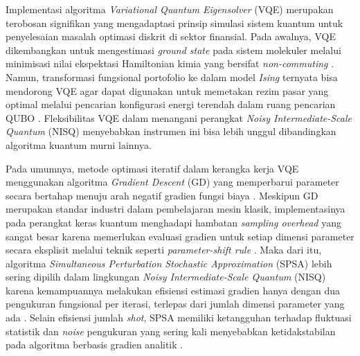 Implementasi algoritma \textit{Variational Quantum Eigensolver} (VQE) merupakan terobosan signifikan yang mengadaptasi prinsip simulasi sistem kuantum untuk penyelesaian masalah optimasi diskrit di sektor finansial. Pada awalnya, VQE dikembangkan untuk mengestimasi \textit{ground state} pada sistem molekuler melalui minimisasi nilai ekspektasi Hamiltonian kimia yang bersifat \textit{non-commuting} \cite{fedorov_vqe_2022}. Namun, transformasi fungsional portofolio ke dalam model \textit{Ising} ternyata bisa mendorong VQE agar dapat digunakan untuk memetakan rezim pasar yang optimal melalui pencarian konfigurasi energi terendah dalam ruang pencarian QUBO \cite{wang_achieving_2025}. Fleksibilitas VQE dalam menangani perangkat \textit{Noisy Intermediate-Scale Quantum} (NISQ) menyebabkan instrumen ini bisa lebih unggul dibandingkan algoritma kuantum murni lainnya\cite{wang_achieving_2025}.

Pada umumnya, metode optimasi iteratif dalam kerangka kerja VQE menggunakan algoritma \textit{Gradient Descent} (GD) yang memperbarui parameter secara bertahap menuju arah negatif gradien fungsi biaya \cite{wang_achieving_2025}. Meskipun GD merupakan standar industri dalam pembelajaran mesin klasik, implementasinya pada perangkat keras kuantum menghadapi hambatan \textit{sampling overhead} yang sangat besar karena memerlukan evaluasi gradien untuk setiap dimensi parameter secara eksplisit melalui teknik seperti \textit{parameter-shift rule} \cite{dao_exploring_2025}. Maka dari itu, algoritma \textit{Simultaneous Perturbation Stochastic Approximation} (SPSA) lebih sering dipilih dalam lingkungan \textit{Noisy Intermediate-Scale Quantum} (NISQ) karena kemampuannya melakukan efisiensi estimasi gradien hanya dengan dua pengukuran fungsional per iterasi, terlepas dari jumlah dimensi parameter yang ada \cite{wang_achieving_2025}. Selain efisiensi jumlah \textit{shot}, SPSA memiliki ketangguhan terhadap fluktuasi statistik dan \textit{noise} pengukuran yang sering kali menyebabkan ketidakstabilan pada algoritma berbasis gradien analitik \cite{spall_implementation_1998}.

